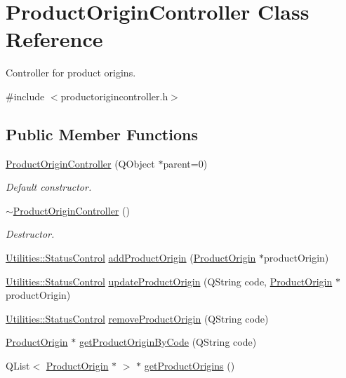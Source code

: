 \hypertarget{class_product_origin_controller}{\section{\-Product\-Origin\-Controller \-Class \-Reference}
\label{class_product_origin_controller}
}


\-Controller for product origins.  




{\ttfamily \#include $<$productorigincontroller.\-h$>$}

\subsection*{\-Public \-Member \-Functions}
\begin{DoxyCompactItemize}
\item 
\hyperlink{class_product_origin_controller_a99784b810eb3699681d124dd73d95e22}{\-Product\-Origin\-Controller} (\-Q\-Object $\ast$parent=0)
\begin{DoxyCompactList}\small\item\em \-Default constructor. \end{DoxyCompactList}\item 
\hyperlink{class_product_origin_controller_af030ea5bddca5d0941cb87debc5b230d}{$\sim$\-Product\-Origin\-Controller} ()
\begin{DoxyCompactList}\small\item\em \-Destructor. \end{DoxyCompactList}\item 
\hyperlink{class_utilities_a2974f062d85bdb0c444a1cbe554bf228}{\-Utilities\-::\-Status\-Control} \hyperlink{class_product_origin_controller_a092b9125bdfa1619bd12a86186d45b76}{add\-Product\-Origin} (\hyperlink{class_product_origin}{\-Product\-Origin} $\ast$product\-Origin)
\item 
\hyperlink{class_utilities_a2974f062d85bdb0c444a1cbe554bf228}{\-Utilities\-::\-Status\-Control} \hyperlink{class_product_origin_controller_ab12c20d21ab2297cb8f4b8005e44abad}{update\-Product\-Origin} (\-Q\-String code, \hyperlink{class_product_origin}{\-Product\-Origin} $\ast$product\-Origin)
\item 
\hyperlink{class_utilities_a2974f062d85bdb0c444a1cbe554bf228}{\-Utilities\-::\-Status\-Control} \hyperlink{class_product_origin_controller_aada989302c4724d08a1a40ad91c5c0dd}{remove\-Product\-Origin} (\-Q\-String code)
\item 
\hyperlink{class_product_origin}{\-Product\-Origin} $\ast$ \hyperlink{class_product_origin_controller_a9832deaef58b447622c3ed3dd2303266}{get\-Product\-Origin\-By\-Code} (\-Q\-String code)
\item 
\-Q\-List$<$ \hyperlink{class_product_origin}{\-Product\-Origin} $\ast$ $>$ $\ast$ \hyperlink{class_product_origin_controller_a5b824ee84c56e194e62727234983becc}{get\-Product\-Origins} ()
\end{DoxyCompactItemize}


